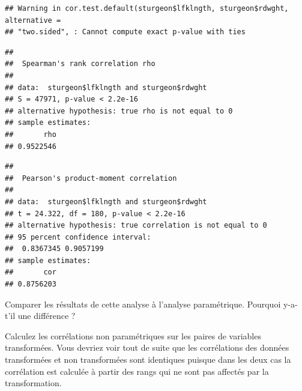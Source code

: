 \documentclass[12pt,]{book}
\newenvironment{Shaded}{\begin{snugshade}}{\end{snugshade}}
\newcommand{\DataTypeTok}[1]{\textcolor[rgb]{0.27,0.27,0.27}{#1}}
\newcommand{\KeywordTok}[1]{\textcolor[rgb]{0.27,0.27,0.27}{\textbf{#1}}}
\newcommand{\NormalTok}[1]{#1}
\newcommand{\OperatorTok}[1]{\textcolor[rgb]{0.43,0.43,0.43}{\textbf{#1}}}
\newcommand{\StringTok}[1]{\textcolor[rgb]{0.5,0.5,0.5}{#1}}
\begin{document}
\begin{Shaded}
\end{Shaded}

\begin{verbatim}
## Warning in cor.test.default(sturgeon$lfklngth, sturgeon$rdwght, alternative =
## "two.sided", : Cannot compute exact p-value with ties
\end{verbatim}

\begin{verbatim}
## 
## 	Spearman's rank correlation rho
## 
## data:  sturgeon$lfklngth and sturgeon$rdwght
## S = 47971, p-value < 2.2e-16
## alternative hypothesis: true rho is not equal to 0
## sample estimates:
##       rho 
## 0.9522546
\end{verbatim}

\begin{Shaded}
\end{Shaded}

\begin{verbatim}
## 
## 	Pearson's product-moment correlation
## 
## data:  sturgeon$lfklngth and sturgeon$rdwght
## t = 24.322, df = 180, p-value < 2.2e-16
## alternative hypothesis: true correlation is not equal to 0
## 95 percent confidence interval:
##  0.8367345 0.9057199
## sample estimates:
##       cor 
## 0.8756203
\end{verbatim}

Comparer les résultats de cette analyse à l'analyse paramétrique.
Pourquoi y-a-t'il une différence ?

Calculez les corrélations non paramétriques sur les paires de variables transformées.
Vous devriez voir tout de suite que les corrélations des données transformées et non transformées sont identiques puisque dans les deux cas la corrélation est calculée à partir des rangs qui ne sont pas affectés par la transformation.
\end{document}
